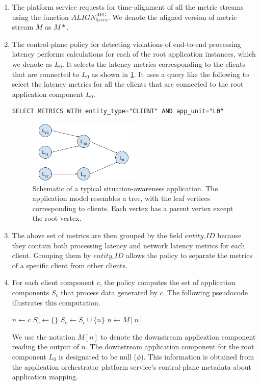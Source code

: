 \begin{enumerate}
The above listings show definitions of metrics corresponding to the processing and network latency of the application component instance $L_{20}$ and $L_{10}$ respectively in the application instance shown in \cref{fig:app_pipeline}. Both these component instances pertain to the application unit which is associated with the "root" application component instance $L_0$. 
\item The platform service requests for time-alignment of all the metric streams using the function $ALIGN^{AVG}_{5secs}$. We denote the aligned version of metric stream $M$ as $M*$.
\item The control-plane policy for detecting violations of end-to-end processing latency performs calculations for each of the root application instances, which we denote as $L_0$. It selects the latency metrics corresponding to the clients that are connected to $L_0$ as shown in \cref{fig:app_pipeline}. It uses a query like the following to select the latency metrics for all the clients that are connected to the root application component $L_0$.
\begin{verbatim}
SELECT METRICS WITH entity_type="CLIENT" AND app_unit="L0"
\end{verbatim}
\begin{figure}
\centering
\includegraphics[width=0.5\textwidth]{figures/mechanisms/monitoring/app_pipeline.png}
\caption{Schematic of a typical situation-awareness application. The application model resembles a tree, with the leaf vertices corresponding to clients. Each vertex has a parent vertex except the root vertex.}
\label{fig:app_pipeline}
\end{figure}
\item The above set of metrics are then grouped by the field $entity\_ID$ because they contain both processing latency and network latency metrics for each client. Grouping them by $entity\_ID$ allows the policy to separate the metrics of a specific client from other clients.
\item For each client component $c$, the policy computes the set of application components $S_c$ that process data generated by $c$. The following pseudocode illustrates this computation.
\begin{algorithmic}
\State $n \gets c$
\State $S_c \gets \{\}$
    \State $S_c \gets S_c \cup \{ n \}$
    \State $n \gets M \left[ n \right]$
\EndWhile
\end{algorithmic}
We use the notation $M \left[ n \right]$ to denote the downstream application component reading the output of $n$. The downstream application component for the root component $L_0$ is designated to be null ($\phi$). This information is obtained from the application orchestrator platform service's control-plane metadata about application mapping.


\end{enumerate}
